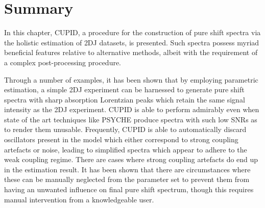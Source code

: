 \section{Summary}
In this chapter, \ac{CUPID}, a procedure for the construction of pure shift
spectra via the holistic estimation of \ac{2DJ} datasets, is presented.
Such spectra possess myriad beneficial features relative to alternative
methods, albeit with the requirement of a complex post-processing procedure.

Through a number of examples, it has been shown that by employing parametric
estimation, a simple \ac{2DJ} experiment can be harnessed to generate pure
shift spectra with sharp absorption Lorentzian peaks which retain the same
signal intensity as the \ac{2DJ} experiment. \ac{CUPID} is able to perform
admirably even when state of the art techniques like \ac{PSYCHE} produce
spectra with such low \acp{SNR} as to render them unusable. Frequently, \ac{CUPID}
is able to automatically discard oscillators present in the model which either
correspond to strong coupling artefacts or noise, leading to simplified spectra
which appear to adhere to the weak coupling regime. There are cases where
strong coupling artefacts do end up in the estimation result. It has been shown
that there are circumstances where these can be manually neglected from the
parameter set to prevent them from having an unwanted influence on final pure
shift spectrum, though this requires manual intervention from a knowledgeable
user.


